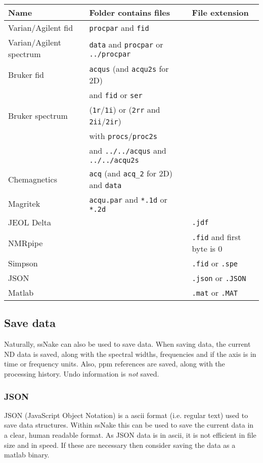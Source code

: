 \documentclass[11pt,a4paper]{article}
\begin{document}
\begin{center}
\begin{tabular}{lll}
\toprule
Name & Folder contains files & File extension\\
\midrule
\rowcolor{gray!30!white}
Varian/Agilent fid &  \texttt{procpar} and \texttt{fid} & \\
Varian/Agilent spectrum&  \texttt{data} and \texttt{procpar} or \texttt{../procpar} & \\
\rowcolor{gray!30!white}
Bruker fid &  \texttt{acqus} (and \texttt{acqu2s} for 2D)  &\\
\rowcolor{gray!30!white}
&and \texttt{fid} or \texttt{ser}&\\
Bruker spectrum & (\texttt{1r}/\texttt{1i}) or (\texttt{2rr} and \texttt{2ii}/\texttt{2ir}) &\\
  & with \texttt{procs}/\texttt{proc2s}  &\\
 &and \texttt{../../acqus} and \texttt{../../acqu2s} & \\
\rowcolor{gray!30!white}
Chemagnetics &  \texttt{acq} (and \texttt{acq\_2} for 2D) and \texttt{data} &\\
Magritek &  \texttt{acqu.par} and \texttt{*.1d} or \texttt{*.2d}&\\
\rowcolor{gray!30!white}
JEOL Delta & & \texttt{.jdf}\\
NMRpipe & & \texttt{.fid} and first byte is 0\\
\rowcolor{gray!30!white}
Simpson &  & \texttt{.fid} or \texttt{.spe} \\
JSON & & \texttt{.json} or \texttt{.JSON}\\
\rowcolor{gray!30!white}
Matlab & & \texttt{.mat} or \texttt{.MAT}\\
\bottomrule
\end{tabular}
\end{center}





\subsection{Save data}
Naturally, ssNake can also be used to save data. When saving data, the current ND data is saved, along with the spectral widths, frequencies and if the axis is in time or frequency units. Also, ppm references are saved, along with the processing history. Undo information is \textit{not} saved.

\subsubsection*{JSON}
JSON (JavaScript Object Notation) is a ascii format (i.e. regular text) used to save data structures. Within ssNake this can be used to save the current data in a clear, human readable format. As JSON data is in ascii, it is not efficient in file size and in speed. If these are necessary then consider saving the data as a matlab binary.
\end{document}

